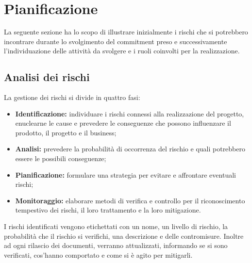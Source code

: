 \section{Pianificazione}
La seguente sezione ha lo scopo di illustrare inizialmente i rischi che si potrebbero incontrare durante lo svolgimento del commitment preso e successivamente l'individuazione delle attività da svolgere e i ruoli coinvolti per la realizzazione.
\subsection{Analisi dei rischi}
\label{AnalisiDeiRischi}
	La gestione dei rischi si divide in quattro fasi:
	\begin{itemize}
		\item \textbf{Identificazione:} individuare i rischi connessi alla realizzazione del progetto, enuclearne le cause e prevedere le conseguenze che possono influenzare il prodotto, il progetto e il business;
		\item \textbf{Analisi:} prevedere la probabilità di occorrenza del rischio e quali potrebbero essere le possibili conseguenze;
		\item \textbf{Pianificazione:} formulare una strategia per evitare e affrontare eventuali rischi;
		\item \textbf{Monitoraggio:} elaborare metodi di verifica e controllo per il riconoscimento tempestivo dei rischi, il loro trattamento e la loro mitigazione.
	\end{itemize}
	I rischi identificati vengono etichettati con un nome, un livello di rischio, la probabilità che il rischio si verifichi, una descrizione e delle contromisure. Inoltre ad ogni rilascio dei documenti, verranno attualizzati, informando se si sono verificati, cos'hanno comportato e come si è agito per mitigarli.	
